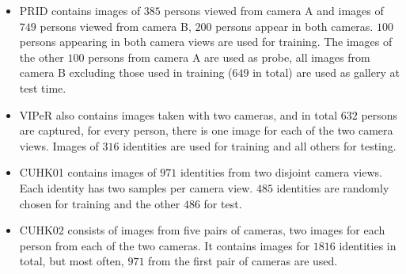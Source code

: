 \begin{itemize}

    \item  PRID \citep{Hirzer_h.:person} contains images of $385$ persons viewed from camera A and images of $749$ persons viewed from camera B,  $200$ persons appear in both cameras. $100$ persons appearing in both camera views are used for training. The images of the other $100$ persons from camera A are used as probe, all images from camera B excluding those used in training ($649$ in total) are used as gallery at test time. 
    
    \item VIPeR \citep{Gray07evaluatingappearance} also contains images taken with two cameras, and in total $632$ persons are captured, for every person, there is one image for each of the two camera views. Images of $316$ identities are used for training and all others for testing.
    
    \item CUHK01 \citep{LiZW12} contains images of $971$ identities from two disjoint camera views. Each identity has two samples per camera view. $485$ identities are randomly chosen for training and the other $486$ for test.  
    \item CUHK02 \citep{li2013locally} consists of images from five pairs of cameras, two images for each person from each of the two cameras. It contains images for $1816$ identities in total, but most often, $971$ from the first pair of cameras are used.
    

\end{itemize}
